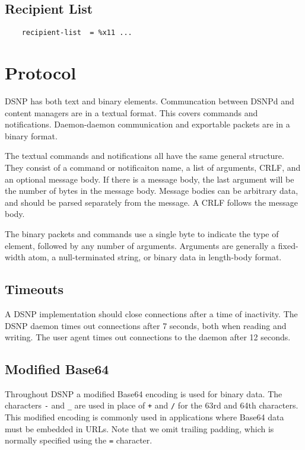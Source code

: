 \documentclass[letterpaper,11pt,oneside]{article}
\begin{document}
\subsection{Recipient List}

\vspace{10pt}
\begin{verbatim}
    recipient-list  = %x11 ...
\end{verbatim}
\vspace{10pt}


%
%

\section{Protocol}

DSNP has both text and binary elements. Communcation between DSNPd and content
managers are in a textual format. This covers commands and notifications.
Daemon-daemon communication and exportable packets are in a binary format.

The textual commands and notifications all have the same general structure.
They consist of a command or notificaiton name, a list of arguments, CRLF, and
an optional message body. If there is a message body, the last argument will be
the number of bytes in the message body. Message bodies can be arbitrary data,
and should be parsed separately from the message. A CRLF follows the message
body.

The binary packets and commands use a single byte to indicate the type of
element, followed by any number of arguments. Arguments are generally a
fixed-width atom, a null-terminated string, or binary data in length-body
format.

\subsection{Timeouts}

A DSNP implementation should close connections after a time of inactivity. The
DSNP daemon times out connections after 7 seconds, both when reading and
writing. The user agent times out connections to the daemon after 12 seconds.

\subsection{Modified Base64}

Throughout DSNP a modified Base64 encoding is used for binary data. The
characters \verb|-| and \verb|_| are used in place of \verb|+| and \verb|/| for
the 63rd and 64th characters. This modified encoding is commonly used in
applications where Base64 data must be embedded in URLs. Note that we omit
trailing padding, which is normally specified using the \verb|=| character.
\end{document}
